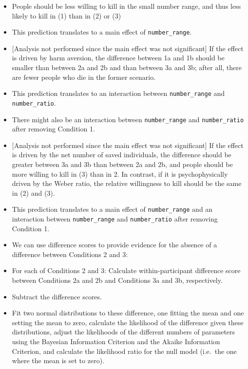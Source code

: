 \documentclass[
]{article}
\providecommand{\tightlist}{%
  \setlength{\itemsep}{0pt}\setlength{\parskip}{0pt}}
\begin{document}
\begin{itemize}
\tightlist
\item
  People should be less willing to kill in the small number range, and thus less likely to kill in (1) than in (2) or (3)
\item
  This prediction translates to a main effect of \texttt{number\_range}.
\item
  {[}Analysis not performed since the main effect was not significant{]} If the effect is driven by harm aversion, the difference between 1a and 1b should be smaller than between 2a and 2b and than between 3a and 3b; after all, there are fewer people who die in the former scenario.
\item
  This prediction translates to an interaction between \texttt{number\_range} and \texttt{number\_ratio}.
\item
  There might also be an interaction between \texttt{number\_range} and \texttt{number\_ratio} after removing Condition 1.
\item
  {[}Analysis not performed since the main effect was not significant{]} If the effect is driven by the net number of saved individuals, the difference should be greater between 3a and 3b than between 2a and 2b, and people should be more willing to kill in (3) than in 2. In contrast, if it is psychophysically driven by the Weber ratio, the relative willingness to kill should be the same in (2) and (3).
\item
  This prediction translates to a main effect of \texttt{number\_range} and an interaction between \texttt{number\_range} and \texttt{number\_ratio} after removing Condition 1.
\item
  We can use difference scores to provide evidence for the absence of a difference between Conditions 2 and 3:
\item
  For each of Conditions 2 and 3: Calculate within-participant difference score between Conditions 2a and 2b and Conditions 3a and 3b, respectively.
\item
  Subtract the difference scores.
\item
  Fit two normal distributions to these difference, one fitting the mean and one setting the mean to zero, calculate the likelihood of the difference given these distributions, adjust the likelihoods of the different numbers of parameters using the Bayesian Information Criterion and the Akaike Information Criterion, and calculate the likelihood ratio for the null model (i.e.~the one where the mean is set to zero).
\end{itemize}
\end{document}
